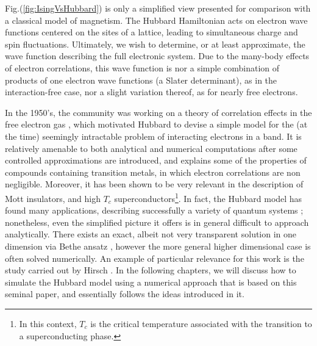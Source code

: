 Fig.(\ref{fig:IsingVsHubbard}) is only a simplified view presented for comparison with a classical model of magnetism.
The Hubbard Hamiltonian acts on electron wave functions centered on the sites of a lattice, leading to simultaneous charge and spin fluctuations. 
Ultimately, we wish to determine, or at least approximate, the wave function describing the full electronic system. 
Due to the many-body effects of electron correlations, this wave function is nor a simple combination of products of one electron wave functions (a Slater determinant), as in the interaction-free case, nor a slight variation thereof, as for nearly free electrons.

In the 1950's, the community was working on a theory of correlation effects in the free electron gas \cite{bohm_collective_1953, gell-mann_correlation_1957, sawada_correlation_1957, hubbard_description_1958, hubbard_description_1958_2, nozieres_electron_1958}, which motivated Hubbard to devise a simple model for the (at the time) seemingly intractable problem of interacting electrons in a band.
It is relatively amenable to both analytical and numerical computations after some controlled approximations are introduced, and explains some of the properties of compounds containing transition metals, in which electron correlations are non negligible.
Moreover, it has been shown to be very relevant in the description of Mott insulators, and high $T_c$  superconductors\footnote{In this context, $T_c$ is the critical temperature associated with the transition to a superconducting phase.}.
In fact, the Hubbard model has found many applications, describing successfully a variety of quantum systems \cite{editorial_hubbard_2013}; nonetheless, even the simplified picture it offers is in general difficult to approach analytically.
There exists an exact, albeit not very transparent solution in one dimension via Bethe ansatz \cite{lieb_absence_1968}, however the more general higher dimensional case is often solved numerically.
An example of particular relevance for this work is the study carried out by Hirsch \cite{hirsch_two-dimensional_1985}.
In the following chapters, we will discuss how to simulate the Hubbard model using a numerical approach that is based on this seminal paper, and essentially follows the ideas introduced in it.